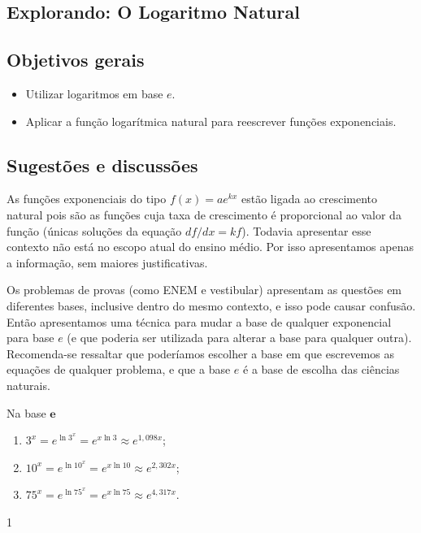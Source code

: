 \cleardoublepage
\def\currentcolor{session1}
\begin{texto}
{
	\section{Explorando: O Logaritmo Natural}
	\subsection{Objetivos gerais}
	\begin{itemize}
	\item Utilizar logaritmos em base $e$.
	\item Aplicar a função logarítmica natural para reescrever funções exponenciais.
	\end{itemize}

	\subsection{Sugestões e discussões}
	As funções exponenciais do tipo $f(x) = a e^{kx}$ estão ligada ao crescimento natural pois são as funções cuja taxa de crescimento é proporcional ao valor da função (únicas soluções da equação $df/dx = k f$).  Todavia apresentar esse contexto não está no escopo atual do ensino médio. Por isso apresentamos apenas a informação, sem maiores justificativas.

	Os problemas de provas (como ENEM e vestibular) apresentam as questões em diferentes bases, inclusive dentro do mesmo contexto, e isso pode causar confusão. Então apresentamos uma técnica para mudar a base de qualquer exponencial para base $e$ (e que poderia ser utilizada para alterar a base para qualquer outra). Recomenda-se ressaltar que poderíamos escolher a base em que escrevemos as equações de qualquer problema, e que a base $e$ é a base de escolha das ciências naturais.
}
\end{texto}
\begin{answer}{Na base $\bm{e}$}
{
	\begin{enumerate}
\item $3^x = e^{\ln 3^x} = e^{x\ln 3} \approx e^{1{,}098 x}$;
\item $10^x = e^{\ln 10^x} = e^{x\ln 10} \approx e^{2{,}302 x}$;
\item $75^x = e^{\ln 75^x} = e^{x\ln 75} \approx e^{4{,}317 x}$.
\end{enumerate}
}{1}
\end{answer}
